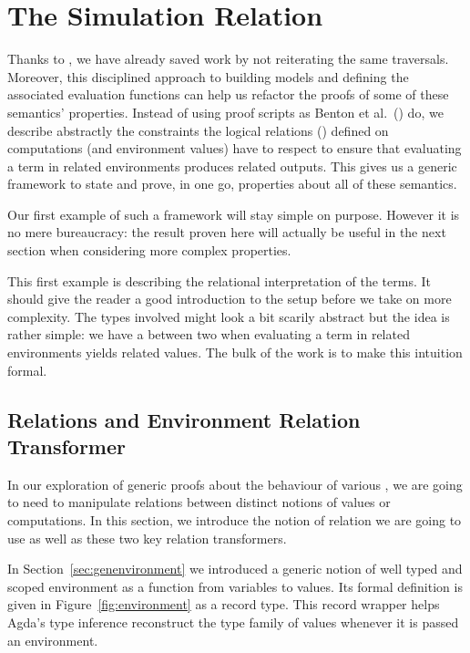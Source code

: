 \chapter{The Simulation Relation}
\label{sec:simulationrel}

Thanks to , we have already saved work by not reiterating the
same traversals. Moreover, this disciplined approach to building models and
defining the associated evaluation functions can help us refactor the proofs
of some of these semantics' properties.
%
Instead of using proof scripts as Benton et al.~(\citeyear{benton2012strongly})
do, we describe abstractly the constraints the logical relations
(\cite{reynolds1983types})
defined on computations (and environment values) have to respect to ensure
that evaluating a term in related environments
produces related outputs. This gives us a generic framework to
state and prove, in one go, properties about all of these semantics.

Our first example of such a framework will stay simple on purpose.
However it is no mere bureaucracy: the
result proven here will actually be useful in the next section
when considering more complex properties.

This first example is describing the relational interpretation of the terms.
It should give the reader a good introduction to the setup before we take on
more complexity. The types involved might look a bit scarily abstract but the
idea is rather simple: we have a  between two 
when evaluating a term in related environments yields related values. The bulk
of the work is to make this intuition formal.



\section{Relations and Environment Relation Transformer}
\label{sec:relation-transformers}

In our exploration of generic proofs about the behaviour of
various , we are going to need to manipulate
relations between distinct notions of values or computations.
In this section, we introduce the notion of relation we are going to
use as well as these two key relation transformers.

In Section~\ref{sec:genenvironment} we introduced a generic notion
of well typed and scoped environment as a function from variables
to values. Its formal definition is given in Figure~\ref{fig:environment}
as a record type. This record wrapper helps Agda's type inference
reconstruct the type family of values whenever it is passed an
environment.

